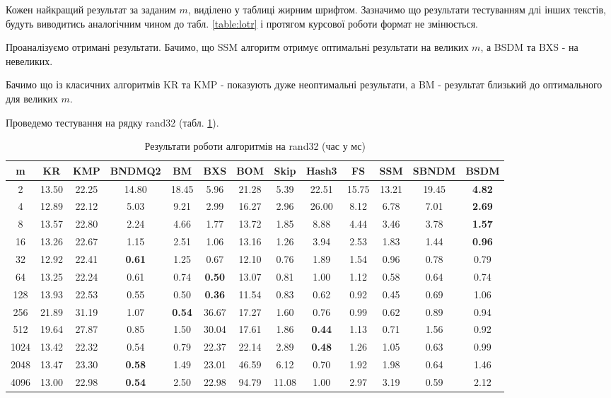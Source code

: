 \documentclass[a4paper,14pt]{extarticle} %
\begin{document}
		Кожен найкращий результат за заданим $m$, виділено у таблиці жирним шрифтом. Зазначимо що результати тестуванням длі інших текстів, будуть виводитись аналогічним чином до табл. \ref{table:lotr} і протягом курсової роботи формат не змінюється.

		Проаналізуємо отримані результати. Бачимо, що SSM алгоритм отримує оптимальні результати на великих $m$, а BSDM та BXS - на невеликих.

		Бачимо що із класичних алгоритмів KR та KMP - показують дуже неоптимальні результати, а BM - результат близький до оптимального для великих $m$.

		Проведемо тестування на рядку rand32 (табл. \ref{table:rand32}).
		\begin{table}[H]
			\centering
			\scriptsize
			\begin{tabular}{|c|c|c|c|c|c|c|c|c|c|c|c|c|}
			\hline
			\textbf{m} & \textbf{KR} & \textbf{KMP} & \textbf{BNDMQ2} & \textbf{BM} & \textbf{BXS} & \textbf{BOM} & \textbf{Skip} & \textbf{Hash3} & \textbf{FS} & \textbf{SSM} & \textbf{SBNDM} & \textbf{BSDM} \\
			\hline
			2 & 13.50 & 22.25 & 14.80 & 18.45 & 5.96 & 21.28 & 5.39 & 22.51 & 15.75 & 13.21 & 19.45 & \textbf{4.82} \\
			\hline
			4 & 12.89 & 22.12 & 5.03 & 9.21 & 2.99 & 16.27 & 2.96 & 26.00 & 8.12 & 6.78 & 7.01 & \textbf{2.69} \\
			\hline
			8 & 13.57 & 22.80 & 2.24 & 4.66 & 1.77 & 13.72 & 1.85 & 8.88 & 4.44 & 3.46 & 3.78 & \textbf{1.57} \\
			\hline
			16 & 13.26 & 22.67 & 1.15 & 2.51 & 1.06 & 13.16 & 1.26 & 3.94 & 2.53 & 1.83 & 1.44 & \textbf{0.96} \\
			\hline
			32 & 12.92 & 22.41 & \textbf{0.61} & 1.25 & 0.67 & 12.10 & 0.76 & 1.89 & 1.54 & 0.96 & 0.78 & 0.79 \\
			\hline
			64 & 13.25 & 22.24 & 0.61 & 0.74 & \textbf{0.50} & 13.07 & 0.81 & 1.00 & 1.12 & 0.58 & 0.64 & 0.74 \\
			\hline
			128 & 13.93 & 22.53 & 0.55 & 0.50 & \textbf{0.36} & 11.54 & 0.83 & 0.62 & 0.92 & 0.45 & 0.69 & 1.06 \\
			\hline
			256 & 21.89 & 31.19 & 1.07 & \textbf{0.54} & 36.67 & 17.27 & 1.60 & 0.76 & 0.99 & 0.62 & 0.89 & 0.94 \\
			\hline
			512 & 19.64 & 27.87 & 0.85 & 1.50 & 30.04 & 17.61 & 1.86 & \textbf{0.44} & 1.13 & 0.71 & 1.56 & 0.92 \\
			\hline
			1024 & 13.42 & 22.32 & 0.54 & 0.79 & 22.37 & 22.14 & 2.89 & \textbf{0.48} & 1.26 & 1.05 & 0.63 & 0.99 \\
			\hline
			2048 & 13.47 & 23.30 & \textbf{0.58} & 1.49 & 23.01 & 46.59 & 6.12 & 0.70 & 1.92 & 1.98 & 0.64 & 1.46 \\
			\hline
			4096 & 13.00 & 22.98 & \textbf{0.54} & 2.50 & 22.98 & 94.79 & 11.08 & 1.00 & 2.97 & 3.19 & 0.59 & 2.12 \\
			\hline
			\end{tabular}
			\caption{Результати роботи алгоритмів на rand32 (час у мс)}
			\label{table:rand32}
			\end{table}
\end{document}

